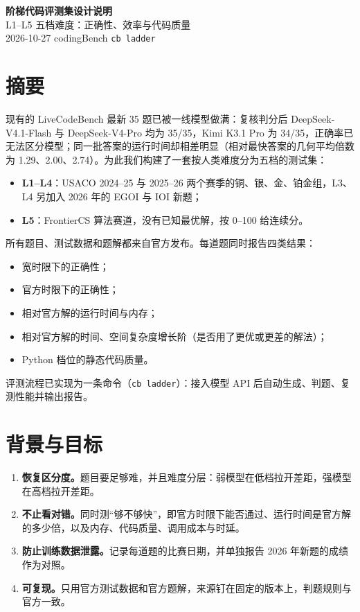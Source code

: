 \documentclass[11pt,a4paper,fontset=none]{ctexart}
\begin{document}
\begin{center}
{\LARGE\bfseries 阶梯代码评测集设计说明}\\[0.4em]
{\large L1--L5 五档难度：正确性、效率与代码质量}\\[0.3em]
{\small 2026-10-27 \quad codingBench \texttt{cb ladder}}
\end{center}

\section*{摘要}
现有的 LiveCodeBench 最新 35 题已被一线模型做满：复核判分后 DeepSeek-V4.1-Flash 与 DeepSeek-V4-Pro 均为 35/35，Kimi K3.1 Pro 为 34/35，正确率已无法区分模型；同一批答案的运行时间却相差明显（相对最快答案的几何平均倍数为 1.29、2.00、2.74）。为此我们构建了一套按人类难度分为五档的测试集：
\begin{itemize}
  \item \textbf{L1--L4}：USACO 2024--25 与 2025--26 两个赛季的铜、银、金、铂金组，L3、L4 另加入 2026 年的 EGOI 与 IOI 新题；
  \item \textbf{L5}：FrontierCS 算法赛道，没有已知最优解，按 0--100 给连续分。
\end{itemize}
所有题目、测试数据和题解都来自官方发布。每道题同时报告四类结果：
\begin{itemize}
  \item 宽时限下的正确性；
  \item 官方时限下的正确性；
  \item 相对官方解的运行时间与内存；
  \item 相对官方解的时间、空间复杂度增长阶（是否用了更优或更差的解法）；
  \item Python 档位的静态代码质量。
\end{itemize}
评测流程已实现为一条命令（\texttt{cb ladder}）：接入模型 API 后自动生成、判题、复测性能并输出报告。

\section{背景与目标}
\begin{enumerate}
  \item \textbf{恢复区分度。}题目要足够难，并且难度分层：弱模型在低档拉开差距，强模型在高档拉开差距。
  \item \textbf{不止看对错。}同时测“够不够快”，即官方时限下能否通过、运行时间是官方解的多少倍，以及内存、代码质量、调用成本与时延。
  \item \textbf{防止训练数据泄露。}记录每道题的比赛日期，并单独报告 2026 年新题的成绩作为对照。
  \item \textbf{可复现。}只用官方测试数据和官方题解，来源钉在固定的版本上，判题规则与官方一致。
\end{enumerate}
\end{document}
